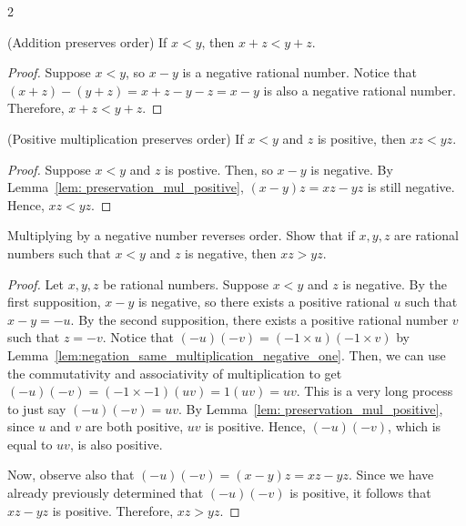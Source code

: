 \begin{multicols}{2}
\begin{proposition}
    (Addition preserves order) If $x < y$, then $x + z < y + z.$
\end{proposition}
\begin{proof}
    Suppose $x < y$, so $x - y$ is a negative rational number.
    Notice that $(x + z) - (y + z) = x + z - y - z= x -y$ is also a negative rational number.
    Therefore, $x + z < y + z.$
\end{proof}

\begin{proposition}
    (Positive multiplication preserves order) If $x < y$ and $z$ is positive, then $xz < yz.$
\end{proposition}
\begin{proof}
    Suppose $x <y$ and $z$ is postive. 
    Then, so $x - y$ is negative. 
    By Lemma~\ref{lem: preservation_mul_positive}, $(x-y)z = xz - yz$ is still negative.
    Hence, $xz < yz.$
\end{proof}
\end{multicols}

\begin{problem}{Multiplying by a negative number reverses order.}
    Show that if $x, y, z$ are rational numbers such that $x < y$ and $z$ is negative, then $xz > yz.$
\end{problem}
\begin{proof}
    Let $x, y, z$ be rational numbers. 
    Suppose $x < y$ and $z$ is negative.
    By the first supposition, $x -  y$ is negative, so there exists a positive rational $u$ such that $x - y = -u.$
    By the second supposition, there exists a positive rational number $v$ such that $z = -v.$
    Notice that $(-u)(-v) = (-1 \times u) (-1 \times v)$ by Lemma~\ref{lem:negation_same_multiplication_negative_one}.
    Then, we can use the commutativity and associativity of multiplication to get $(-u)(-v) = (-1 \times -1) (uv)=1(uv)=uv.$
    This is a very long process to just say $(-u)(-v) = uv.$
    By Lemma~\ref{lem: preservation_mul_positive}, since $u$ and $v$ are both positive, $uv$ is positive. Hence, $(-u)(-v)$, which is equal to $uv$, is also positive.

    Now, observe also that $(-u)(-v) = (x - y)z = xz - yz$.
    Since we have already previously determined that $(-u)(-v)$ is positive, it follows that $xz - yz$ is positive.
    Therefore, $xz > yz.$
\end{proof}
